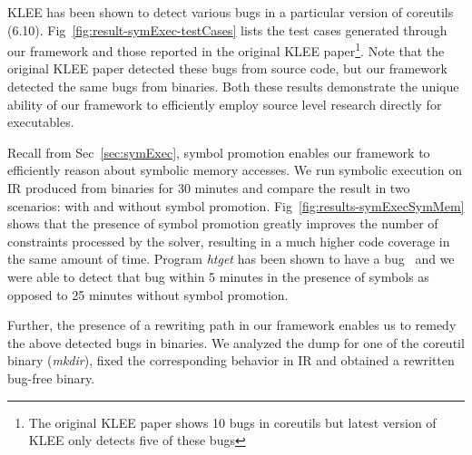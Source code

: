 %
KLEE has been shown to detect various bugs in a particular version of coreutils (6.10). Fig~\ref{fig:result-symExec-testCases} lists the test cases generated through our framework and those reported in the original KLEE paper\footnote{The original KLEE paper shows 10 bugs in coreutils but latest version of KLEE only detects five of these bugs}. Note that the original KLEE paper detected these bugs from source code, but our framework detected the same bugs from binaries. Both these results demonstrate the unique ability of our framework to efficiently employ source level research directly for executables. 

%
Recall from Sec~\ref{sec:symExec}, symbol promotion enables our framework to efficiently reason about symbolic memory accesses. We run symbolic execution on IR produced from binaries for 30 minutes and compare the result in two scenarios: with and without symbol promotion. Fig~\ref{fig:results-symExecSymMem} shows that the presence of symbol promotion greatly improves the number of constraints processed by the solver, resulting in a much higher code coverage in the same amount of time. Program \emph{htget} has been shown to have a bug~\cite{Brumley-Mayhem} and we were able to detect that bug within 5 minutes in the presence of symbols as opposed to 25 minutes without symbol promotion.

Further, the presence of a rewriting path in our framework enables us to remedy the above detected bugs in binaries. We analyzed the dump for one of the coreutil binary (\emph{mkdir}), fixed the corresponding behavior in IR and obtained a rewritten bug-free binary.

